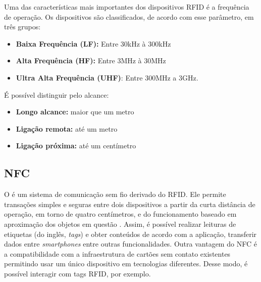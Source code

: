 

Uma das características mais importantes dos dispositivos RFID é a frequência de operação.
Os dispositivos são classificados, de acordo com esse parâmetro, em três grupos:

\begin{itemize} \parskip -3pt
	\item \textbf{Baixa Frequência (LF):} Entre 30kHz à 300kHz
	\item \textbf{Alta Frequência (HF):} Entre 3MHz à 30MHz
	\item \textbf{Ultra Alta Frequência (UHF)}: Entre 300MHz a 3GHz.
\end{itemize}

É possível distinguir pelo alcance:

\begin{itemize} \parskip -3pt
	\item \textbf{Longo alcance:} maior que um metro
	\item \textbf{Ligação remota:} até um metro
	\item \textbf{Ligação próxima:} até um centímetro
\end{itemize}


\subsection{NFC}
O  é um sistema de comunicação sem fio derivado do RFID. Ele permite transações simples e seguras entre dois dispositivos a partir da curta distância de operação, em torno de quatro centímetros, e do funcionamento baseado em aproximação dos objetos em questão \cite{NFCForum2016}. 
Assim, é possível realizar leituras de etiquetas (do inglês, \textit{tags}) e obter conteúdos de acordo com a aplicação, transferir dados entre \textit{smartphones} entre outras funcionalidades.
Outra vantagem do NFC é a compatibilidade com a infraestrutura de cartões sem contato existentes permitindo usar um único dispositivo em tecnologias diferentes. Desse modo, é possível interagir com tags RFID, por exemplo.


